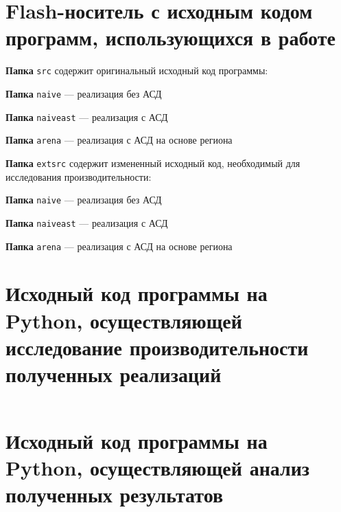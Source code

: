 \documentclass[bachelor, och, otchet]{SCWorks}
\begin{document}
\section{Flash-носитель с исходным кодом программ, использующихся в работе}
\noindent \textbf{Папка} \verb|src| содержит оригинальный исходный код
программы:

\textbf{Папка} \verb|naive| — реализация без АСД

\textbf{Папка} \verb|naiveast| — реализация с АСД

\textbf{Папка} \verb|arena| — реализация с АСД на основе региона

\noindent \textbf{Папка} \verb|extsrc| содержит измененный исходный код,
необходимый для исследования производительности:

\textbf{Папка} \verb|naive| — реализация без АСД

\textbf{Папка} \verb|naiveast| — реализация с АСД

\textbf{Папка} \verb|arena| — реализация с АСД на основе региона


\section{Исходный код программы на Python, осуществляющей исследование 
производительности полученных реализаций}

\inputminted{python}{test.py}

\section{Исходный код программы на Python, осуществляющей анализ полученных
результатов}

\inputminted{python}{graph.py}
\end{document}
